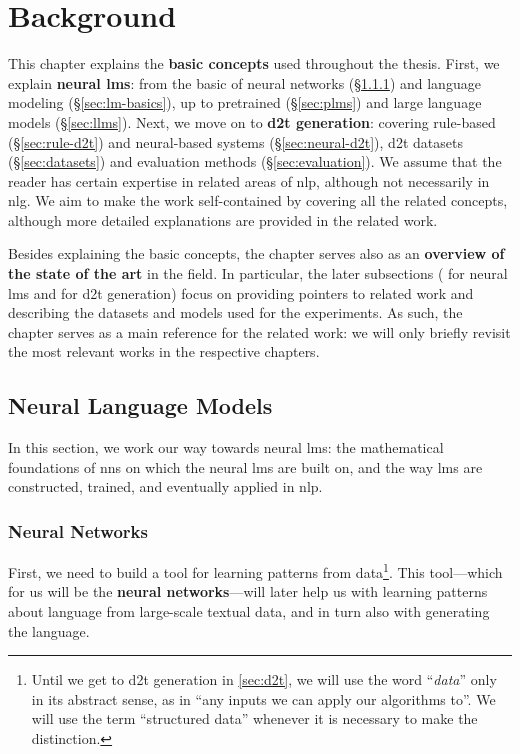 
\chapter{Background}
\label{chap:background}

This chapter explains the \textbf{basic concepts} used throughout the thesis. First, we explain \textbf{neural \acp{lm}}: from the basic of neural networks (§\ref{sec:nns}) and language modeling (§\ref{sec:lm-basics}), up to pretrained (§\ref{sec:plms}) and large language models (§\ref{sec:llms}). Next, we move on to \textbf{\ac{d2t} generation}: covering rule-based (§\ref{sec:rule-d2t}) and neural-based systems (§\ref{sec:neural-d2t}), \ac{d2t} datasets (§\ref{sec:datasets}) and evaluation methods (§\ref{sec:evaluation}). We assume that the reader has certain expertise in related areas of \ac{nlp}, although not necessarily in \ac{nlg}. We aim to make the work self-contained by covering all the related concepts, although more detailed explanations are provided in the related work.

Besides explaining the basic concepts, the chapter serves also as an \textbf{overview of the state of the art} in the field. In particular, the later subsections ( for neural \acp{lm} and  for \ac{d2t} generation) focus on providing pointers to related work and describing the datasets and models used for the experiments. As such, the chapter serves as a main reference for the related work: we will only briefly revisit the most relevant works in the respective chapters.


\section{Neural Language Models}
\label{sec:lms}
In this section, we work our way towards neural \acp{lm}: the mathematical foundations of \acp{nn} on which the neural \acp{lm} are built on, and the way \acp{lm} are constructed, trained, and eventually applied in \ac{nlp}.

\subsection{Neural Networks}
\label{sec:nns}
First, we need to build a tool for learning patterns from data\footnote{Until we get to \ac{d2t} generation in \autoref{sec:d2t}, we will use the word ``\textit{data}'' only in its abstract sense, as in ``any inputs we can apply our algorithms to''. We will use the term ``structured data'' whenever it is necessary to make the distinction.}. This tool---which for us will be the \textbf{neural networks}---will later help us with learning patterns about language from large-scale textual data, and in turn also with generating the language.


